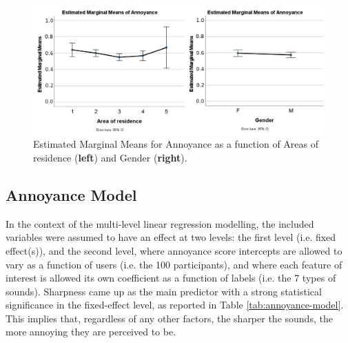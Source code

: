 \begin{figure}[h]
  \label{fig:anova}
  \centering
  \includegraphics[width=\textwidth]{Figures/orga_anovas.png}
  \caption{Estimated Marginal Means for Annoyance as a function of Areas of residence (\textbf{left}) and Gender (\textbf{right}).}
\end{figure}

\subsection{Annoyance Model}
In the context of the multi-level linear regression modelling, the included variables were assumed to have an effect at two levels: the first level (i.e. fixed effect(s)), and the second level, where annoyance score intercepts are allowed to vary as a function of users (i.e. the 100 participants), and where each feature of interest is allowed its own coefficient as a function of labels (i.e. the 7 types of sounds). Sharpness came up as the main predictor with a strong statistical significance in the fixed-effect level, as reported in Table \ref{tab:annoyance-model}. This implies that, regardless of any other factors, the sharper the sounds, the more annoying they are perceived to be.

